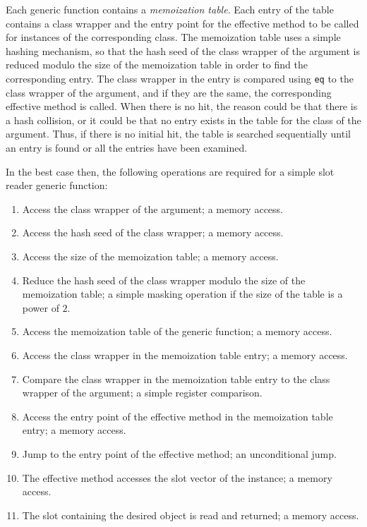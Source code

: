 Each generic function contains a \emph{memoization table}.  Each entry
of the table contains a class wrapper and the entry point for the
effective method to be called for instances of the corresponding
class.  The memoization table uses a simple hashing mechanism, so that
the hash seed of the class wrapper of the argument is reduced modulo
the size of the memoization table in order to find the corresponding
entry.  The class wrapper in the entry is compared using \texttt{eq}
to the class wrapper of the argument, and if they are the same, the
corresponding effective method is called.  When there is no hit, the
reason could be that there is a hash collision, or it could be that no
entry exists in the table for the class of the argument.  Thus, if
there is no initial hit, the table is searched sequentially until an
entry is found or all the entries have been examined.

In the best case then, the following operations are required for a
simple slot reader generic function:

\begin{enumerate}
\item Access the class wrapper of the argument; a memory access.
\item Access the hash seed of the class wrapper; a memory access.
\item Access the size of the memoization table; a memory access.
\item Reduce the hash seed of the class wrapper modulo the size of the
  memoization table; a simple masking operation if the size of the
  table is a power of $2$.
\item Access the memoization table of the generic function; a memory
  access.
\item Access the class wrapper in the memoization table entry; a
  memory access.
\item Compare the class wrapper in the memoization table entry to the
  class wrapper of the argument; a simple register comparison.
\item Access the entry point of the effective method in the
  memoization table entry; a memory access.
\item Jump to the entry point of the effective method; an
  unconditional jump.
\item The effective method accesses the slot vector of the instance; a
  memory access.
\item The slot containing the desired object is read and returned; a
  memory access.
\end{enumerate}

